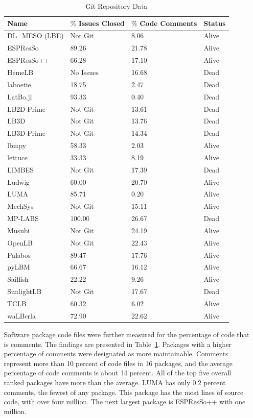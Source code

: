 \documentclass[final, 3p, times, authoryear]{elsarticle}
\begin{document}
\begin{table}
	\begin{center}
		\begin{tabular}{ p{3.5cm}p{3.5cm}p{3.5cm}p{2.5cm} }
			\hline
			Name & $\%$ Issues Closed & $\%$ Code Comments & Status\\
			\hline
			DL\_MESO (LBE) & Not Git & 8.06& Alive\\
			ESPResSo & 89.26 & 21.78 & Alive\\
			ESPResSo++ & 66.28 & 17.10 & Alive\\
			HemeLB & No Issues & 16.68 & Dead\\
			laboetie & 18.75 & 2.47 & Dead\\		
			LatBo.jl & 93.33 & 0.40 & Dead\\
			LB2D-Prime & Not Git & 13.61 & Dead\\
			LB3D & Not Git & 13.76 & Dead\\
			LB3D-Prime & Not Git & 14.34 & Dead\\
			lbmpy& 58.33  & 2.03 & Alive\\
			lettuce & 33.33 & 8.19 & Alive\\
			LIMBES & Not Git & 17.39 & Dead\\
			Ludwig& 60.00 & 20.70 & Alive\\
			LUMA& 85.71   & 0.20 & Alive\\
			MechSys & Not Git & 15.11 & Alive\\
			MP-LABS & 100.00 & 26.67 & Dead\\
			Musubi & Not Git & 24.19 & Alive\\
			OpenLB & Not Git & 22.43 & Alive\\
			Palabos & 89.47 & 17.76 & Alive\\
			pyLBM & 66.67& 16.12 & Alive\\
			Sailfish & 22.22 & 9.26 & Alive\\
			SunlightLB & Not Git & 17.67 & Dead\\
			TCLB & 60.32 & 6.02 & Alive\\
			waLBerla & 72.90 & 22.62 & Alive\\
			\hline
		\end{tabular}
		\caption{Git Repository Data} \label{gitrepodata}
	\end{center}
	\end{table}
		
Software package code files were further measured for the percentage of code
that is comments. The findings are presented in Table~\ref{gitrepodata}.
Packages with a higher percentage of comments were designated as more
maintainable. Comments represent more than 10 percent of code files in 16
packages, and the average percentage of code comments is about 14 percent. All
of the top five overall ranked packages have more than the average. LUMA has only 0.2 percent comments, the fewest of any package. This package has the most lines of source code, with over four million. The next largest package is ESPResSo++ with one million.
\end{document}
